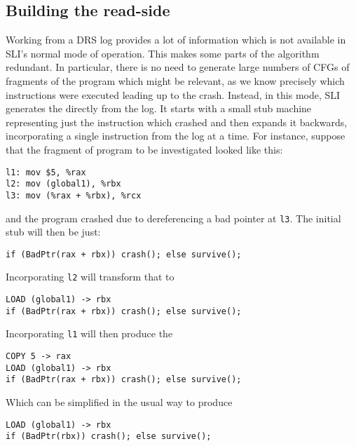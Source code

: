 \subsection{Building the read-side \StateMachine}

Working from a DRS log provides a lot of information which is not available in SLI's normal mode of operation.
This makes some parts of the algorithm redundant.
In particular, there is no need to generate large numbers of CFGs of fragments of the program which might be relevant, as we know precisely which instructions were executed leading up to the crash.
Instead, in this mode, SLI generates the \StateMachine directly from the log.
It starts with a small stub machine representing just the instruction which crashed and then expands it backwards, incorporating a single instruction from the log at a time.
For instance, suppose that the fragment of program to be investigated looked like this:

\begin{verbatim}
l1: mov $5, %rax
l2: mov (global1), %rbx
l3: mov (%rax + %rbx), %rcx
\end{verbatim}

and the program crashed due to dereferencing a bad pointer at \verb|l3|.
The initial stub \StateMachine will then be just:

\begin{verbatim}
if (BadPtr(rax + rbx)) crash(); else survive();
\end{verbatim}

Incorporating \verb|l2| will transform that to

\begin{verbatim}
LOAD (global1) -> rbx
if (BadPtr(rax + rbx)) crash(); else survive();
\end{verbatim}

Incorporating \verb|l1| will then produce the \StateMachine

\begin{verbatim}
COPY 5 -> rax
LOAD (global1) -> rbx
if (BadPtr(rax + rbx)) crash(); else survive();
\end{verbatim}

Which can be simplified in the usual way to produce

\begin{verbatim}
LOAD (global1) -> rbx
if (BadPtr(rbx)) crash(); else survive();
\end{verbatim}

